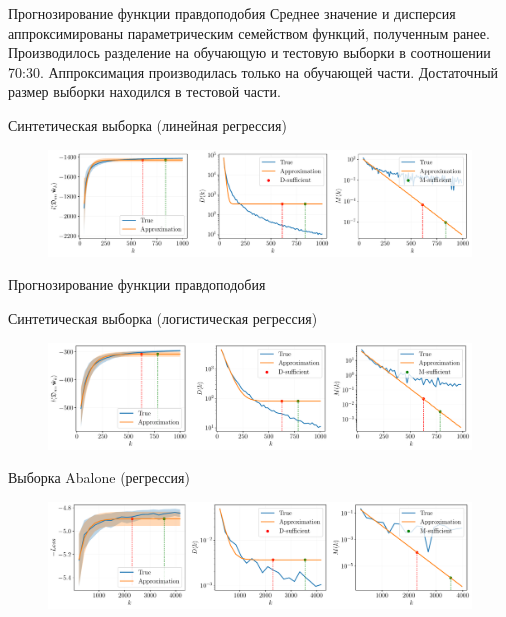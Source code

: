 \documentclass[10pt]{beamer}
\begin{document}
\begin{frame}{Прогнозирование функции правдоподобия}
    Среднее значение и дисперсия аппроксимированы параметрическим семейством функций, полученным ранее. Производилось разделение на обучающую и тестовую выборки в соотношении 70:30. Аппроксимация производилась только на обучающей части. Достаточный размер выборки находился в тестовой части.
    \vfill
    \begin{block}{Синтетическая выборка (линейная регрессия)}
        \begin{figure}[h!]
            \centering
            \includegraphics[width=\textwidth]{paper/figures/synthetic-regression-approximation.pdf}
        \end{figure}
    \end{block}
\end{frame}
\begin{frame}{Прогнозирование функции правдоподобия}
    \begin{block}{Синтетическая выборка (логистическая регрессия)}
        \begin{figure}[h!]
            \centering
            \includegraphics[width=\textwidth]{paper/figures/synthetic-classification-approximation.pdf}
        \end{figure}
    \end{block}
    \vfill
    \begin{block}{Выборка Abalone (регрессия)}
        \begin{figure}[h!]
            \centering
            \includegraphics[width=\textwidth]{paper/figures/abalone-approximation.pdf}
        \end{figure}
    \end{block}
\end{frame}
\end{document}

